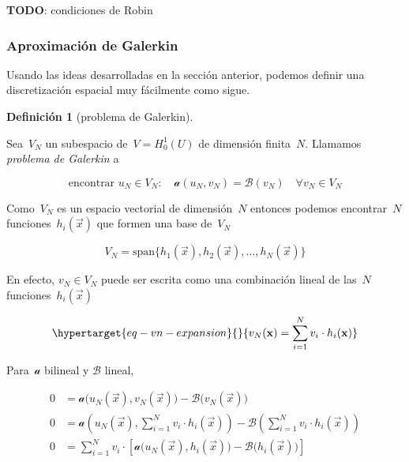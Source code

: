 \documentclass[
  12pt,
  a4paper,
  table]{scrbook}
\theoremstyle{plain}
\theoremstyle{definition}
\newtheorem{definition}{Definición}[chapter]
\theoremstyle{plain}
\theoremstyle{plain}
\theoremstyle{remark}
\begin{document}
\textbf{TODO}: condiciones de Robin

\hypertarget{sec-galerkin}{%
\subsubsection{Aproximación de Galerkin}\label{sec-galerkin}}

Usando las ideas desarrolladas en la sección anterior, podemos definir
una discretización espacial muy fácilmente como sigue.

\begin{definition}[problema de
Galerkin]\protect\hypertarget{def-galerkin}{}\label{def-galerkin}

Sea~\(V_N\) un subespacio de~\(V = H^1_0(U)\) de dimensión finita~\(N\).
Llamamos \emph{problema de Galerkin} a

\[
\text{encontrar~} u_N \in V_N: \quad
\mathcal{a} (u_N, v_N) = \mathcal{B} (v_N)
\quad  \forall v_N \in V_N
\]

\end{definition}

Como~\(V_N\) es un espacio vectorial de dimensión~\(N\) entonces podemos
encontrar~\(N\) funciones~\(h_i(\vec{x})\) que formen una base
de~\(V_N\)

\[
V_N = \text{span}\Big\{ h_1(\vec{x}), h_2(\vec{x}), \dots, h_N(\vec{x})\Big\}
\]

En efecto, \(v_N \in V_N\) puede ser escrita como una combinación lineal
de las~\(N\) funciones~\(h_i(\vec{x})\)

\begin{equation}\protect\hypertarget{eq-vn-expansion}{}{
v_N(\vec{x}) = \sum_{i=1}^N v_i \cdot h_i(\vec{x})
}\label{eq-vn-expansion}\end{equation}

Para~\(\mathcal{a}\) bilineal y \(\mathcal{B}\) lineal,

\[
\begin{aligned}
0 &= \mathcal{a} \Big(u_N(\vec{x}), v_N(\vec{x})\Big) - \mathcal{B} \Big(v_N(\vec{x})\Big)\\
0 &= \mathcal{a} \left(u_N(\vec{x}), \sum_{i=1}^N v_i \cdot h_i\left(\vec{x}\right)\right) - \mathcal{B} \left(\sum_{i=1}^N v_i \cdot h_i\left(\vec{x}\right)\right) \\
0 &= \sum_{i=1}^N v_i \cdot \left[ \mathcal{a} \Big(u_N(\vec{x}), h_i\left(\vec{x}\right)\Big) - \mathcal{B} \Big(h_i\left(\vec{x}\right)\Big) \right] \\
\end{aligned}
\]
\end{document}
